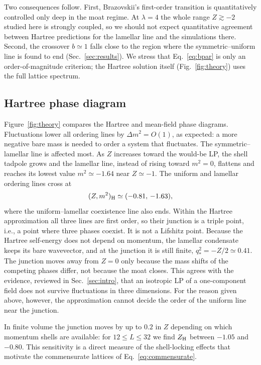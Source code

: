 \documentclass[aps,prd,twocolumn,superscriptaddress,nofootinbib,10pt]{revtex4-2}
\newcommand{\qs}{q_*}
\begin{document}
Two consequences follow.  First, Brazovskii's first-order transition is
quantitatively controlled only deep in the moat regime.  At $\lambda=4$ the
whole range $Z\gtrsim-2$ studied here is strongly coupled, so we should not
expect quantitative agreement between Hartree predictions for the lamellar
line and the simulations there.  Second, the crossover $b\simeq1$ falls close
to the region where the symmetric--uniform line is found to end
(Sec.~\ref{sec:results}).  We stress that Eq.~\eqref{eq:bpar} is only an
order-of-magnitude criterion; the Hartree solution itself
(Fig.~\ref{fig:theory}) uses the full lattice spectrum.

\subsection{Hartree phase diagram}

Figure~\ref{fig:theory} compares the Hartree and mean-field phase diagrams.
Fluctuations lower all ordering lines by $\Delta m^2=O(1)$, as expected: a
more negative bare mass is needed to order a system that fluctuates.  The
symmetric--lamellar line is affected most.  As $Z$ increases toward the
would-be LP, the shell tadpole grows and the lamellar line, instead of rising
toward $m^2=0$, flattens and reaches its lowest value $m^2\simeq-1.64$ near
$Z\simeq-1$.  The uniform and lamellar ordering lines cross at
\begin{equation}
 (Z,m^2)_{\rm H}\simeq(-0.81,\,-1.63),
 \label{eq:hartree-meet}
\end{equation}
where the uniform--lamellar coexistence line also ends.  Within the Hartree
approximation all three lines are first order, so their junction is a triple
point, i.e., a point where three phases coexist.  It is not a Lifshitz point.
Because the Hartree self-energy does not depend on momentum, the lamellar
condensate keeps its bare wavevector, and at the junction it is still finite,
$\qs^2=-Z/2\simeq0.41$.  The junction moves away from $Z=0$ only because the
mass shifts of the competing phases differ, not because the moat closes.  This
agrees with the evidence, reviewed in Sec.~\ref{sec:intro}, that an isotropic
LP of a one-component field does not survive fluctuations in three
dimensions.  For the reason given above,
however, the approximation cannot decide the order of the uniform line near
the junction.

In finite volume the junction moves by up to $0.2$ in $Z$ depending on which
momentum shells are available: for $12\le L\le32$ we find $Z_{\rm H}$ between
$-1.05$ and $-0.80$.  This sensitivity is a direct measure of the
shell-locking effects that motivate the commensurate lattices of
Eq.~\eqref{eq:commensurate}.
\end{document}

